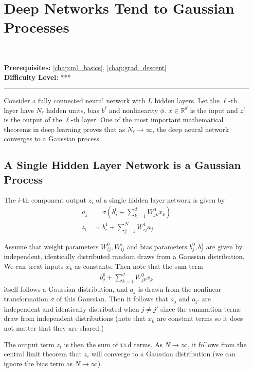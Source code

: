 \documentclass[book.tex]{subfiles}
\begin{document}
\chapter{Deep Networks Tend to Gaussian Processes}
\label{chap:ntk}
\noindent\rule{11cm}{0.4pt} \\
\textbf{Prerequisites:}  \autoref{chap:ml_basics}, \autoref{chap:grad_descent}  \\
\textbf{Difficulty Level:} *** \\
\noindent\rule{11cm}{0.4pt}
\vspace{5mm}


Consider a fully connected neural network with $L$ hidden layers. Let the $\ell$-th layer have $N_\ell$ hidden units, bias $b^\ell$ and nonlinearity $\phi$. $x \in \mathbb{R}^d$ is the input and $z^{\ell}$ is the output of the $\ell$-th layer. One of the most important mathematical theorems in deep learning proves that as $N_\ell \to \infty$, the deep neural network converges to a Gaussian process. 

\section{A Single Hidden Layer Network is a Gaussian Process}
The $i$-th component output $z_i$ of a single hidden layer network is given by 
\begin{align}
a_j &= \sigma \left ( b^0_j + \sum_{k=1}^d W^0_{jk} x_k \right ) \\
z_i &= b^1_i + \sum_{j=1}^{N} W^1_{ij} a_j 
\end{align}

Assume that weight parameters $W^0_{ij}, W^1_{ij}$ and bias parameters $b^0_j, b^1_j$ are given by independent, identically distributed random draws from a Gaussian distribution. We can treat inputs $x_k$ as constants. Then note that the sum term
\begin{align}
b^0_j + \sum_{k=1}^d W^0_{jk} x_k
\end{align}
itself follows a Gaussian distribution, and $a_j$ is drawn from the nonlinear transformation $\sigma$ of this Gaussian. Then it follows that $a_j$ and $a_{j'}$ are independent and identically distributed when $j \neq j'$ since the summation terms draw from independent distributions (note that $x_k$ are constant terms so it does not matter that they are shared.) 

The output term $z_i$ is then the sum of i.i.d terms. As $N \to \infty$, it follows from the central limit theorem that $z_i$ will converge to a Gaussian distribution (we can ignore the bias term as $N \to \infty$).
\end{document}
